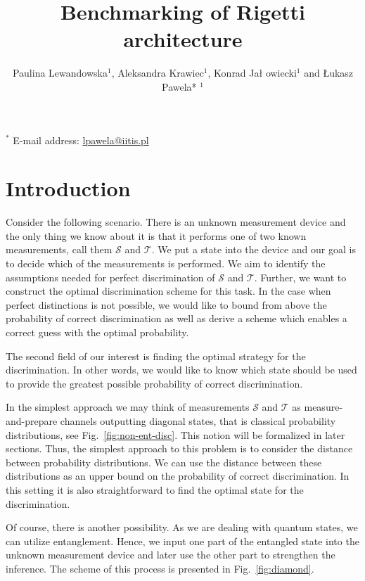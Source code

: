 \documentclass[11pt,a4paper,reqno, oneside]{amsart}
\title{Benchmarking of Rigetti architecture}
\author{Paulina Lewandowska$^{1}$, Aleksandra Krawiec$^{1}$, Konrad Ja\l 
owiecki$^1$ and \L ukasz Pawela* $^{1}$}
\newcommand{\1}{{\rm 1\hspace{-0.9mm}l}}
\newcommand{\TT}{\mathcal{T}}
\begin{document}
\maketitle
$^{*}$ \normalsize{E-mail address: \url{lpawela@iitis.pl}}
\begin{abstract}

\end{abstract}

\section{Introduction}




Consider the following scenario. There is an unknown measurement device and the
only thing we know about it is that it performs one of two known measurements,
call them $\mathcal{S}$ and $\mathcal{T}$. We put a state into the device and
our goal is to decide which of the measurements is performed. We aim to identify
the assumptions needed for perfect discrimination of $\mathcal{S}$ and $\TT$.
Further, we want to construct the optimal discrimination scheme for this task. 
In
the case when perfect distinctions is not possible, we would like to bound
from above the probability of correct discrimination as well as derive a scheme
which enables a correct guess with the optimal probability.

The second field of our interest is finding the optimal strategy for the
discrimination. In other words, we would like to know which state should be used
to provide the greatest possible probability of correct discrimination.

In the simplest approach we may think of measurements $\mathcal{S}$ and $\TT$
as measure-and-prepare channels outputting diagonal states, that is classical
probability distributions, see Fig.~\ref{fig:non-ent-disc}. This notion will be
formalized in later sections. Thus, the simplest approach to this problem is to
consider the distance between probability distributions. We can use the distance
between these distributions as an upper bound on the probability of correct
discrimination. In this setting it is also straightforward to find the optimal
state for the discrimination.

Of course, there is another possibility. As we are dealing with quantum states,
we can utilize entanglement. Hence, we input one part of the entangled state
into the unknown measurement device and later use the other part to strengthen
the inference. The scheme of this process is presented in
Fig.~\ref{fig:diamond}.
\end{document}
